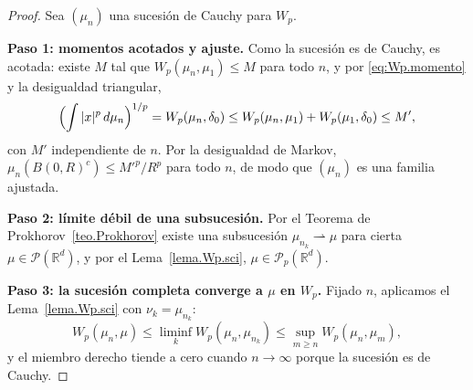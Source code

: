 \documentclass[12pt, a4paper]{amsbook}
\newcommand{\R}{{\mathbb R}}
\theoremstyle{remark}
\theoremstyle{definition}
\numberwithin{section}{chapter}
\numberwithin{subsection}{section}
\numberwithin{equation}{section}
\numberwithin{figure}{chapter}
\begin{document}
\begin{proof}
Sea $(\mu_n)$ una sucesión de Cauchy para $W_p$.

\medskip
\textbf{Paso 1: momentos acotados y ajuste.} Como la sucesión es de Cauchy,
es acotada: existe $M$ tal que $W_p(\mu_n,\mu_1)\le M$ para todo $n$, y por
\eqref{eq:Wp.momento} y la desigualdad triangular,
\[
\Bigl(\int|x|^p\,d\mu_n\Bigr)^{1/p}=W_p(\mu_n,\delta_0)\le W_p(\mu_n,\mu_1)+W_p(\mu_1,\delta_0)\le M',
\]
con $M'$ independiente de $n$. Por la desigualdad de Markov,
$\mu_n(B(0,R)^c)\le M'^p/R^p$ para todo $n$, de modo que $(\mu_n)$ es una
familia ajustada.

\medskip
\textbf{Paso 2: límite débil de una subsucesión.} Por el Teorema de
Prokhorov~\ref{teo.Prokhorov} existe una subsucesión $\mu_{n_k}\rightharpoonup\mu$
para cierta $\mu\in\mathcal P(\R^d)$, y por el Lema~\ref{lema.Wp.sci},
$\mu\in\mathcal P_p(\R^d)$.

\medskip
\textbf{Paso 3: la sucesión completa converge a $\mu$ en $W_p$.} Fijado $n$,
aplicamos el Lema~\ref{lema.Wp.sci} con $\nu_k=\mu_{n_k}$:
\[
W_p(\mu_n,\mu)\le\liminf_kW_p(\mu_n,\mu_{n_k})\le\sup_{m\ge n}W_p(\mu_n,\mu_m),
\]
y el miembro derecho tiende a cero cuando $n\to\infty$ porque la sucesión es
de Cauchy.
\end{proof}
\end{document}
